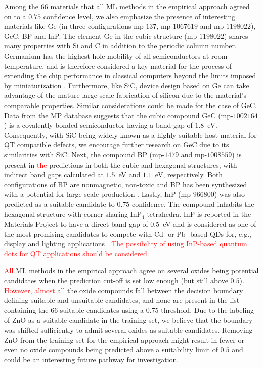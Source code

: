 \documentclass[superscriptaddress,unsortedaddress,
 amsmath,amssymb,
 aps,
]{revtex4-2}
\newcommand{\mrk}[1]{\textcolor{red}{#1}}
\begin{document}
Among the $66$ materials that all ML methods in the empirical approach agreed on to a $0.75$ confidence level, we also emphasize the presence of interesting materials like Ge (in three configurations mp-$137$, mp-$1067619$ and mp-$1198022$), GeC, BP and InP. The element Ge in the cubic structure (mp-$1198022$) shares many properties with Si and C in addition to the periodic column number. 
Germanium has the highest hole mobility of all semiconductors at room temperature, and is therefore considered a key material for the process of extending the chip performance in classical computers beyond the limits imposed by miniaturization \cite{Scappucci2020}. Furthermore, like SiC, device design based on Ge can take advantage of the mature large-scale fabrication of silicon due to the material's comparable properties.  
Similar considerations could be made for the case of GeC. 
Data from the MP database suggests that the cubic compound GeC (mp-$1002164$) is a covalently bonded semiconductor having a band gap of $1.8$~eV. 
Consequently, with SiC being widely known as a highly suitable host material for QT compatible defects, we encourage further research on GeC due to its similarities with SiC. 
Next, the compound BP (mp-$1479$ and mp-$1008559$) is present in \mrk{the} predictions in both the cubic and hexagonal structures, with indirect band gaps calculated at $1.5$~eV and $1.1$~eV, respectively. Both configurations of BP are nonmagnetic, non-toxic and BP has been synthesized with a potential for large-scale production \cite{MukhanovVladimirA2016Umso}. 
Lastly, InP (mp-$966800$) was also predicted as a suitable candidate to $0.75$ confidence. The compound inhabits the hexagonal structure with corner-sharing InP$_4$ tetrahedra. InP is reported in the Materials Project to have a direct band gap of $0.5$~eV and is considered as one of the most promising candidates to compete with Cd- or Pb- based QDs for, e.g., display and lighting applications  \cite{Zhang2020a, Won2019}. 
\mrk{The possibility of using InP-based quantum dots for QT applications should be considered.}  

\mrk{All} ML methods in the empirical approach agree on several oxides being potential candidates when the prediction cut-off is set low enough (but still above $0.5$). \mrk{However, almost} all the oxide compounds fall between the decision boundary defining suitable and unsuitable candidates, and none are present in the list containing the $66$ suitable candidates using a $0.75$ threshold. Due to the labeling of ZnO as a suitable candidate in the training set, we believe that the boundary was shifted sufficiently to admit several oxides as suitable candidates. Removing ZnO from the training set for the empirical approach might result in fewer or even no oxide compounds being predicted above a suitability limit of $0.5$ and could be an interesting future pathway for investigation. 
\end{document}
